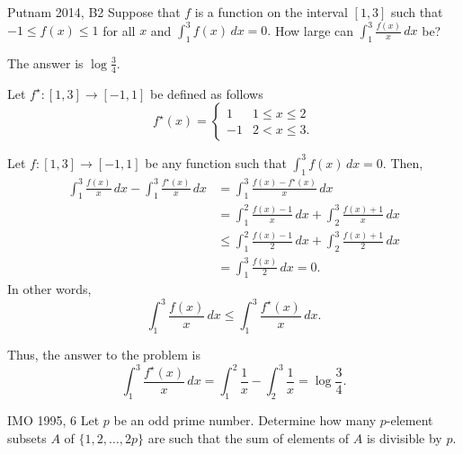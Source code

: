 
\begin{prob}{Putnam 2014, B2}{}
        Suppose that $f$ is a function on the interval $[1,3]$ such that $-1\le f(x)\le 1$ for all $x$ and $\displaystyle \int_1^3f(x)\,dx=0.$ How large can $\displaystyle\int_1^3\frac{f(x)}x\,dx$ be?
\end{prob}

\begin{sol}{}{}
	The answer is \(\boxed{\log\frac{3}{4}.}\)

	Let \(f^\star\colon [1, 3] \to [-1, 1]\) be defined as follows \[
		f^\star(x) =
		\begin{cases}
			1 & 1 \leq x \leq 2 \\
			-1 & 2 < x \leq 3.
		\end{cases}
	\]

	Let \(f\colon [1, 3] \to [-1, 1]\) be any function such that \(\displaystyle \int_1^3f(x)\,dx=0\). Then, 
	\begin{align*}
		\int_1^3\frac{f(x)}{x}\,dx - \int_1^3\frac{f^\star(x)}{x}\,dx 
		&= \int_1^3 \frac{f(x) - f^\star(x)}{x}\,dx \\
		&= \int_1^2 \frac{f(x) - 1}{x}\,dx + \int_2^3 \frac{f(x) + 1}{x}\,dx \\
		&\leq \int_1^2 \frac{f(x) - 1}{2}\,dx + \int_2^3 \frac{f(x) + 1}{2}\,dx \\
		&= \int_1^3 \frac{f(x)}{2}\,dx = 0.
	\end{align*}
	In other words, \[
		\int_1^3\frac{f(x)}{x}\,dx \leq \int_1^3\frac{f^\star(x)}{x}\,dx.
	\]

	Thus, the answer to the problem is \[
		\int_1^3\frac{f^\star(x)}{x}\,dx = \int_1^2 \frac{1}{x} - \int_2^3\frac{1}{x} = \log\frac{3}{4}.
	\]
\end{sol}

\begin{prob}{IMO 1995, 6}{}
	Let $p$ be an odd prime number. Determine how many $p$-element subsets $A$ of $ \{1,2,\dots,2p\}$ are such that the sum of elements of \(A\) is divisible by $p$.
\end{prob}

